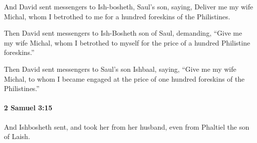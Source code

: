 			\begin{versebox}
					\item[BHS] 
					\item[ASV] And David sent messengers to Ish-bosheth, Saul's son, saying, Deliver me my wife Michal, whom I betrothed to me for a hundred foreskins of the Philistines.
					\item[NIV] Then David sent messengers to Ish-Bosheth son of Saul, demanding, “Give me my wife Michal, whom I betrothed to myself for the price of a hundred Philistine foreskins.”
					\item[NRSV] Then David sent messengers to Saul’s son Ishbaal, saying, “Give me my wife Michal, to whom I became engaged at the price of one hundred foreskins of the Philistines.”
			\end{versebox}

		\paragraph{2 Samuel 3:15} %
			\label{2SAMUEL-3-15}

			And Ishbosheth sent, and took her from her husband, even from Phaltiel the son of Laish.

